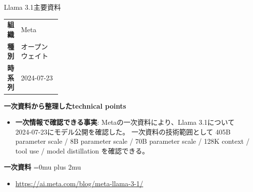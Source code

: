 \begin{technicalnote}{Llama 3.1}{主要資料}
\begingroup
\begin{tabularx}{\linewidth}{@{}>{\bfseries}p{0.22\linewidth}X@{}}
組織 & Meta \\
種別 & オープンウェイト \\
時系列 & 2024-07-23 \\
\end{tabularx}
\smallskip
{\bfseries 一次資料から整理したtechnical points}
\begin{itemize}[leftmargin=1.5em,itemsep=0.35em]
\item \textbf{一次情報で確認できる事実}: Metaの一次資料により、Llama 3.1について2024-07-23にモデル公開を確認した。 一次資料の技術範囲として 405B parameter scale / 8B parameter scale / 70B parameter scale / 128K context / tool use / model distillation を確認できる。
\end{itemize}
\begin{minipage}{\linewidth}
\begin{samepage}
{\bfseries 一次資料}
\begingroup\sloppy
\Urlmuskip=0mu plus 2mu\relax
\begin{itemize}[leftmargin=1.5em,itemsep=0.25em]
\item {\scriptsize\url{https://ai.meta.com/blog/meta-llama-3-1/}}
\end{itemize}
\endgroup
\end{samepage}
\end{minipage}
\endgroup
\end{technicalnote}
\medskip

